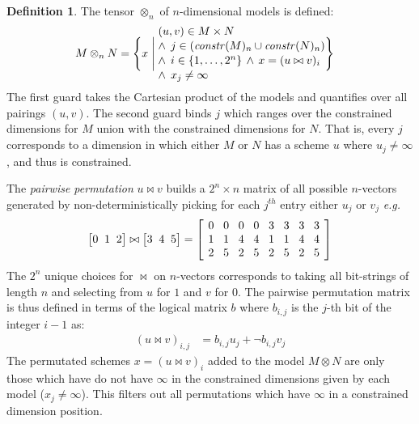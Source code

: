 \documentclass[9pt]{sigplanconf}
\newcounter{block}
\theoremstyle{definition}
\newtheorem{definition}[block]{Definition}
\newcommand{\eg}{\emph{e.g.}}
\newcommand{\vthreeh}[3]{\setlength{\arraycolsep}{0em}
\left[\begin{array}{ccc}#1 \; & \; #2 \; & \; #3\end{array}\right]}
\newcommand{\effdims}[2]{\mathit{constr}(#1)_{#2}}
\begin{document}
\begin{definition}The tensor $\otimes_n$ of $n$-dimensional
models is defined:
\begin{alignat*}{2}
& M \otimes_n N =
  \Bigg\{x \; \Bigg| \;
    \parbox{5.2cm}{$(u, v) \in M \times N $ \\[0.1em]
                 $\;\; \wedge \;\, j \in (\effdims{M}{n} \cup
                   \effdims{N}{n})$\\[0.1em]
                  $\;\; \wedge \;\, i \in \{1, \ldots, 2^n\} \, \wedge
                  \, x = (u \bowtie v)_i$ \\[0.1em]
                   $\;\; \wedge \;\, x_j \neq \infty$
                  } \Bigg\}
\end{alignat*}
The first guard takes the Cartesian product of
the models and quantifies over all pairings $(u, v)$.
The second guard binds $j$ which ranges over the constrained
dimensions for $M$ union with the constrained dimensions for $N$.
That is, every $j$ corresponds to a dimension in which
either $M$ or $N$ has a scheme $u$ where $u_j \neq \infty$,
and thus is constrained.

The \emph{pairwise permutation} $u \bowtie v$ 
builds a $2^n \times n$ matrix 
of all possible $n$-vectors generated by
non-deterministically picking for each $j^{th}$ entry either 
$u_j$ or $v_j$ \eg{}
%
\begin{equation*}
\vthreeh{0}{1}{2} \bowtie \vthreeh{3}{4}{5} =
\left[
\setlength{\arraycolsep}{0.42em}
\begin{array}{cccccccc}
0 & 0 & 0 & 0 & 3 & 3 & 3 & 3 \\
1 & 1 & 4 & 4 & 1 & 1 & 4 & 4 \\
2 & 5 & 2 & 5 & 2 & 5 & 2 & 5
\end{array}
\right]
\end{equation*}
%
The $2^n$ unique choices for $\bowtie$ on $n$-vectors
corresponds to taking all bit-strings of length $n$ and
selecting from $u$ for $1$ and $v$ for $0$. The pairwise permutation
matrix is thus defined in terms of the logical
matrix $b$ where $b_{i,j}$ is the $j$-th bit of the integer
$i - 1$ as:
%
\begin{align*}
(u \bowtie v)_{i,j} & = b_{i,j} u_j + \neg b_{i,j} v_j
\end{align*}
%
The permutated schemes $x = (u \bowtie v)_i$ added to the model 
$M \otimes N$ are only those which have do not have $\infty$ in 
the constrained dimensions given by each model ($x_j \neq
\infty$). This filters out all permutations which have
$\infty$ in a constrained dimension position. 
\end{definition}
\end{document}
